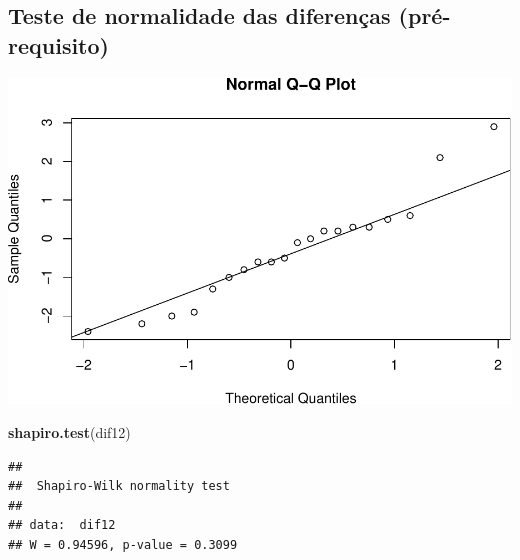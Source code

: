 \documentclass[
]{book}
\newenvironment{Shaded}{\begin{snugshade}}{\end{snugshade}}
\newcommand{\FunctionTok}[1]{\textcolor[rgb]{0.13,0.29,0.53}{\textbf{#1}}}
\newcommand{\NormalTok}[1]{#1}
\newcommand{\OtherTok}[1]{\textcolor[rgb]{0.56,0.35,0.01}{#1}}
\newcommand{\SpecialCharTok}[1]{\textcolor[rgb]{0.81,0.36,0.00}{\textbf{#1}}}
\begin{document}
\subsection{Teste de normalidade das diferenças (pré-requisito)}\label{teste-de-normalidade-das-diferenuxe7as-pruxe9-requisito}

\begin{Shaded}
\end{Shaded}

\includegraphics{LivroEstatisticaR_files/figure-latex/AnovaRnormtest-1.pdf}

\begin{Shaded}
\begin{Highlighting}[]
\FunctionTok{shapiro.test}\NormalTok{(dif12)}
\end{Highlighting}
\end{Shaded}

\begin{verbatim}
## 
##  Shapiro-Wilk normality test
## 
## data:  dif12
## W = 0.94596, p-value = 0.3099
\end{verbatim}
\end{document}
